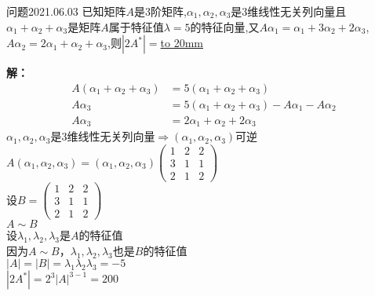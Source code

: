 \begin{mybox}{问题2021.06.03}
	\qquad 已知矩阵$A$是3阶矩阵,$\alpha_{1},\alpha_{2},\alpha_{3}$是3维线性无关列向量且$\alpha_{1}+\alpha_{2}+\alpha_{3}$是矩阵$A$属于特征值$\lambda=5$的特征向量,又$A\alpha_{1}=\alpha_{1}+3\alpha_{2}+2\alpha_{3}$,$A\alpha_{2}=2\alpha_{1}+\alpha_{2}+\alpha_{3}$,则$\left|2A^{*}\right|=$\underline{\hbox to 20mm{}}
\end{mybox}	
\noindent
\textbf{解：}
\begin{align*}
A(\alpha_{1}+\alpha_{2}+\alpha_{3})&=5(\alpha_{1}+\alpha_{2}+\alpha_{3})\\
A\alpha_{3}&=5(\alpha_{1}+\alpha_{2}+\alpha_{3})-A\alpha_{1}-A\alpha_{2}\\
A\alpha_{3}&=2\alpha_{1}+\alpha_{2}+2\alpha_{3}
\end{align*}
$\alpha_{1},\alpha_{2},\alpha_{3}$是3维线性无关列向量$\Rightarrow (\alpha_{1},\alpha_{2},\alpha_{3})$可逆\\
$A(\alpha_{1},\alpha_{2},\alpha_{3})=(\alpha_{1},\alpha_{2},\alpha_{3})\begin{pmatrix}
1 & 2 & 2 \\ 
3 & 1 & 1 \\ 
2 & 1 & 2
\end{pmatrix} $\\
设$B=\begin{pmatrix}
1 & 2 & 2 \\ 
3 & 1 & 1 \\ 
2 & 1 & 2
\end{pmatrix}$\\
$A\sim B$\\
设$\lambda_{1},\lambda_{2},\lambda_{3}$是$A$的特征值\\
因为$A\sim B$，$\lambda_{1},\lambda_{2},\lambda_{3}$也是$B$的特征值\\
$\left|A\right|=\left|B\right|=\lambda_{1}\lambda_{2}\lambda_{3}=-5$\\
$\left|2A^{*}\right|=2^{3}\left|A\right|^{3-1}
=200$